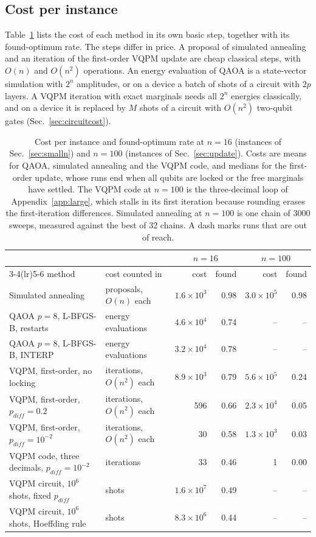 \documentclass[onecolumn,10pt]{article}
\theoremstyle{remark}
\theoremstyle{plain}
\begin{document}
\subsection{Cost per instance}
\label{sec:cost}
Table~\ref{tab:cost} lists the cost of each method in its own basic step, together with its found-optimum rate. The steps differ in price. A proposal of simulated annealing and an iteration of the first-order VQPM update are cheap classical steps, with $O(n)$ and $O(n^2)$ operations. An energy evaluation of QAOA is a state-vector simulation with $2^n$ amplitudes, or on a device a batch of shots of a circuit with $2p$ layers. A VQPM iteration with exact marginals needs all $2^n$ energies classically, and on a device it is replaced by $M$ shots of a circuit with $O(n^2)$ two-qubit gates (Sec.~\ref{sec:circuitcost}).

\begin{table}[ht]
\centering
\small
\setlength{\tabcolsep}{4pt}
\caption{Cost per instance and found-optimum rate at $n=16$ (instances of Sec.~\ref{sec:smalln}) and $n=100$ (instances of Sec.~\ref{sec:update}). Costs are means for QAOA, simulated annealing and the VQPM code, and medians for the first-order update, whose runs end when all qubits are locked or the free marginals have settled. The VQPM code at $n=100$ is the three-decimal loop of Appendix~\ref{app:large}, which stalls in its first iteration because rounding erases the first-iteration differences. Simulated annealing at $n=100$ is one chain of 3000 sweeps, measured against the best of 32 chains. A dash marks runs that are out of reach.}
\label{tab:cost}
\begin{tabular}{l l rr rr}
\toprule
 & & \multicolumn{2}{c}{$n=16$} & \multicolumn{2}{c}{$n=100$} \\
\cmidrule(lr){3-4}\cmidrule(lr){5-6}
method & cost counted in & cost & found & cost & found \\
\midrule
Simulated annealing & proposals, $O(n)$ each & $1.6\times10^3$ & 0.98 & $3.0\times10^5$ & 0.98 \\
QAOA $p=8$, L-BFGS-B, restarts & energy evaluations & $4.6\times10^4$ & 0.74 & -- & -- \\
QAOA $p=8$, L-BFGS-B, INTERP & energy evaluations & $3.2\times10^4$ & 0.78 & -- & -- \\
\midrule
VQPM, first-order, no locking & iterations, $O(n^2)$ each & $8.9\times10^3$ & 0.79 & $5.6\times10^5$ & 0.24 \\
VQPM, first-order, $p_{diff}=0.2$ & iterations, $O(n^2)$ each & 596 & 0.66 & $2.3\times10^4$ & 0.05 \\
VQPM, first-order, $p_{diff}=10^{-2}$ & iterations, $O(n^2)$ each & 30 & 0.58 & $1.3\times10^3$ & 0.03 \\
VQPM code, three decimals, $p_{diff}=10^{-2}$ & iterations & 33 & 0.46 & 1 & 0.00 \\
\midrule
VQPM circuit, $10^6$ shots, fixed $p_{diff}$ & shots & $1.6\times10^7$ & 0.49 & -- & -- \\
VQPM circuit, $10^6$ shots, Hoeffding rule & shots & $8.3\times10^6$ & 0.44 & -- & -- \\
\bottomrule
\end{tabular}
\end{table}
\end{document}
